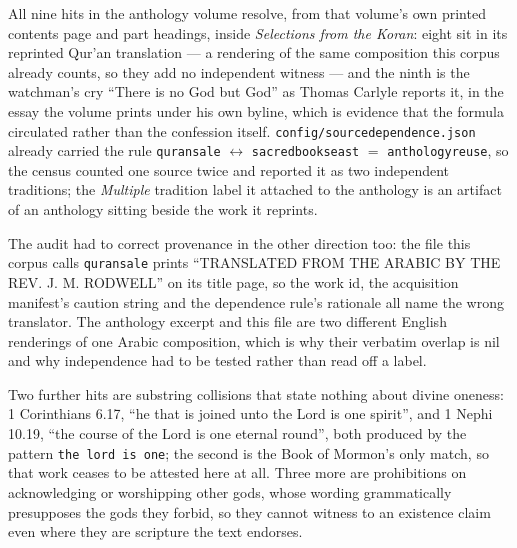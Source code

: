 \documentclass[11pt]{article}
\DeclareRobustCommand{\_}{\textunderscore\allowbreak}
\begin{document}
All nine hits in the anthology volume resolve, from that volume's own printed
contents page and part headings, inside \emph{Selections from the Koran}: eight
sit in its reprinted Qur'an translation --- a rendering of the same composition
this corpus already counts, so they add no independent witness --- and the ninth
is the watchman's cry ``There is no God but God'' as Thomas Carlyle reports it, in
the essay the volume prints under his own byline, which is evidence that the
formula circulated rather than the confession itself.
\texttt{config/source\_dependence.json} already carried the rule
\texttt{quran\_sale} \(\leftrightarrow\) \texttt{sacred\_books\_east} \(=\)
\texttt{anthology\_reuse}, so the census counted one source twice and reported it
as two independent traditions; the \emph{Multiple} tradition label it attached to
the anthology is an artifact of an anthology sitting beside the work it reprints.

The audit had to correct provenance in the other direction too: the file this
corpus calls \texttt{quran\_sale} prints ``TRANSLATED FROM THE ARABIC BY THE REV.
J. M. RODWELL'' on its title page, so the work id, the acquisition manifest's
caution string and the dependence rule's rationale all name the wrong translator.
The anthology excerpt and this file are two different English renderings of one
Arabic composition, which is why their verbatim overlap is nil and why
independence had to be tested rather than read off a label.

Two further hits are substring collisions that state nothing about divine
oneness: 1 Corinthians 6.17, ``he that is joined unto the Lord is one spirit'',
and 1 Nephi 10.19, ``the course of the Lord is one eternal round'', both produced
by the pattern \texttt{the lord is one}; the second is the Book of Mormon's only
match, so that work ceases to be attested here at all. Three more are
prohibitions on acknowledging or worshipping other gods, whose wording
grammatically presupposes the gods they forbid, so they cannot witness to an
existence claim even where they are scripture the text endorses.
\end{document}
